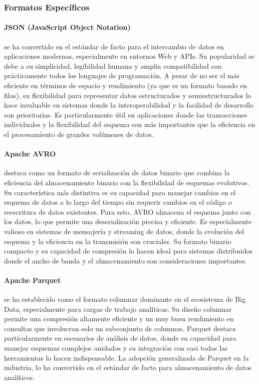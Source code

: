 \subsubsection{Formatos Específicos}

\paragraph{JSON (JavaScript Object Notation)} 
se ha convertido en el estándar de facto para el intercambio 
de datos en aplicaciones modernas, especialmente en entornos Web y APIs. Su popularidad se debe a su 
simplicidad, legibilidad humana y amplia compatibilidad con prácticamente todos los lenguajes de 
programación. A pesar de no ser el más eficiente en términos de espacio y rendimiento (ya que es un formato basado en filas), 
su flexibilidad para representar datos estructurados y semiestructurados lo hace invaluable en sistemas donde la 
interoperabilidad y la facilidad de desarrollo son prioritarias. Es particularmente útil en aplicaciones
donde las transacciones individuales y la flexibilidad del esquema son más importantes que la 
eficiencia en el procesamiento de grandes volúmenes de datos.

\paragraph{Apache AVRO} 
destaca como un formato de serialización de datos binario que combina la 
eficiencia del almacenamiento binario con la flexibilidad de esquemas evolutivos. Su característica 
más distintiva es su capacidad para manejar cambios en el esquema de datos a lo largo del tiempo sin 
requerir cambios en el código o reescritura de datos existentes. Para esto, AVRO almacena el esquema junto con 
los datos, lo que permite una deserialización precisa y eficiente. Es especialmente valioso en 
sistemas de mensajería y streaming de datos, donde la evolución del esquema y la 
eficiencia en la transmisión son cruciales. Su formato binario compacto y su capacidad de compresión 
lo hacen ideal para sistemas distribuidos donde el ancho de banda y el almacenamiento son 
consideraciones importantes.

\paragraph{Apache Parquet} 
se ha establecido como el formato columnar dominante en el ecosistema de 
Big Data, especialmente para cargas de trabajo analíticas. Su diseño columnar permite una compresión 
altamente eficiente y un muy buen rendimiento en consultas que involucran solo un subconjunto de 
columnas. Parquet destaca particularmente en escenarios de análisis de datos, 
donde su capacidad para manejar esquemas complejos anidados y su integración con 
casi todas las herramientas lo hacen indispensable. La adopción generalizada de Parquet en la 
industria, lo ha convertido en el estándar de facto para almacenamiento de datos analíticos.

